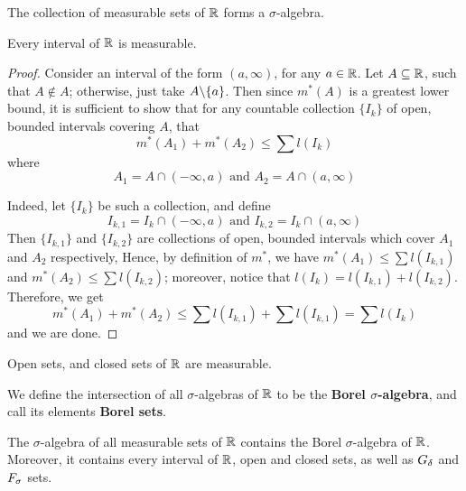 \begin{theorem}\label{2.2.9}
    The collection of measurable sets of $\mathbb{R}$ forms a  $\sigma$-algebra.
\end{theorem}

\begin{lemma}\label{2.2.10}
    Every interval of $\mathbb{R}$ is measurable.
\end{lemma}
\begin{proof}
    Consider an interval of the form $(a,\infty)$, for any $a \in \mathbb{R}$. Let  $A
    \subseteq \mathbb{R}$, such that  $A \notin A$; otherwise, just take
    $A\backslash\{a\}$. Then since $m^\ast(A)$ is a greatest lower bound, it is
    sufficient to show that for any countable collection $\{I_k\}$ of open,
    bounded intervals covering $A$, that
    \begin{equation*}
        m^\ast(A_1)+m^\ast(A_2) \leq \sum{l(I_k)}
    \end{equation*}
    where
    \begin{equation*}
        A_1=A \cap (-\infty,a) \text{ and } A_2=A \cap (a,\infty)
    \end{equation*}

    Indeed, let $\{I_k\}$ be such a collection, and define
    \begin{equation*}
        I_{k,1}=I_k \cap (-\infty,a) \text{ and } I_{k,2}=I_k \cap (a,\infty)
    \end{equation*}
    Then $\{I_{k,1}\}$ and $\{I_{k,2}\}$ are collections of open, bounded
    intervals which cover $A_1$ and $A_2$ respectively, Hence, by definition of
    $m^\ast$, we have  $m^\ast(A_1) \leq \sum{l(I_{k,1})}$ and $m^\ast(A_2) \leq
    \sum{l(I_{k,2})}$; moreover, notice that $l(I_k)=l(I_{k,1})+l(I_{k,2})$.
    Therefore, we get
    \begin{equation*}
        m^\ast(A_1)+m^\ast(A_2) \leq \sum{l(I_{k,1})}+\sum{l(I_{k,1})}=\sum{l(I_k)}
    \end{equation*}
    and we are done.
\end{proof}
\begin{corollary}
    Open sets, and closed sets of $\mathbb{R}$ are measurable.
\end{corollary}

\begin{definition}
    We define the intersection of all $\sigma$-algebras of  $\mathbb{R}$ to be the
    \textbf{Borel $\sigma$-algebra}, and call its elements \textbf{Borel sets}.
\end{definition}

\begin{theorem}\label{2.2.11}
    The $\sigma$-algebra of all measurable sets of  $\mathbb{R}$ contains the Borel
    $\sigma$-algebra of  $\mathbb{R}$. Moreover, it contains every interval of  $\mathbb{R}$,
    open and closed sets, as well as  $G_\delta$ and  $F_\sigma$ sets.
\end{theorem}

